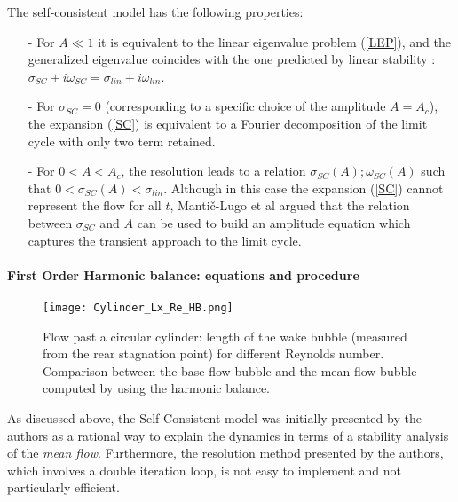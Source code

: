 \documentclass[twocolumn,10pt]{asme2ej}
\begin{document}
The self-consistent model has the following properties:
\begin{itemize}
\item[-] For $A \ll 1$ it is equivalent to the linear eigenvalue problem (\ref{LEP}), and the generalized eigenvalue coincides with the one predicted by linear stability : $\sigma_{SC} + i \omega_{SC} = \sigma_{lin} + i \omega_{lin}$.
\item[-] For $\sigma_{SC}=0$ (corresponding to a specific choice of the amplitude $A=A_c$),  the expansion (\ref{SC}) is equivalent to a Fourier decomposition of the limit cycle with only two term retained.
\item[-] For $0<A<A_c$, the resolution leads to a relation $\sigma_{SC}(A) ; \omega_{SC}(A)$
such that $0< \sigma_{SC}(A) < \sigma_{lin}$.
 Although in this case the expansion ({\ref{SC}}) cannot represent the flow for all $t$, Manti\v{c}-Lugo et al \cite{MLugo2014} argued that the relation between $\sigma_{SC}$ and $A$ can be used to build an amplitude equation which captures the transient approach to the limit cycle. 
\end{itemize}


\paragraph{{\color{red}First Order Harmonic balance: equations and procedure} }

\begin{figure}
\begin{center}
\texttt{[image: Cylinder\_Lx\_Re\_HB.png]}
\end{center}
\caption{Flow past a circular cylinder: length of the wake bubble (measured from the 
rear stagnation point) for different Reynolds number. Comparison between the base flow bubble and the mean flow bubble computed by using the harmonic balance.}
\label{fig:recirculation_lengh}
\end{figure}


As discussed above, the Self-Consistent model was initially presented by the authors as a rational way to explain the dynamics in terms of a stability analysis of the {\em mean flow}. Furthermore, the resolution method presented by the authors, which involves a double iteration loop, is not easy to implement and not particularly efficient.
\end{document}
